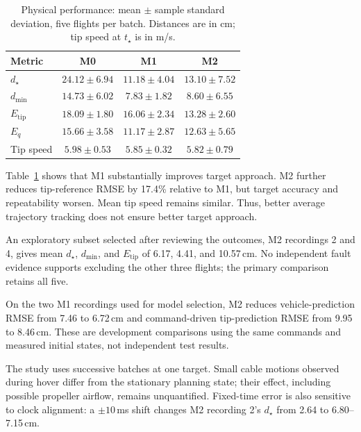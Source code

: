 \begin{table}[t]
\centering
\caption{Physical performance: mean $\pm$ sample standard
deviation, five flights per batch. Distances are in cm;
tip speed at $t_\star$ is in m/s.}
\label{tab:physical_performance}
\small
\setlength{\tabcolsep}{3pt}
\begin{tabular}{@{}lccc@{}}
\toprule
Metric & M0 & M1 & M2 \\
\midrule
$d_\star$ & $24.12\pm6.94$ & $11.18\pm4.04$ & $13.10\pm7.52$ \\
$d_{\min}$ & $14.73\pm6.02$ & $7.83\pm1.82$ & $8.60\pm6.55$ \\
$E_{\mathrm{tip}}$ & $18.09\pm1.80$ & $16.06\pm2.34$ & $13.28\pm2.60$ \\
$E_q$ & $15.66\pm3.58$ & $11.17\pm2.87$ & $12.63\pm5.65$ \\
Tip speed & $5.98\pm0.53$ & $5.85\pm0.32$ & $5.82\pm0.79$ \\
\bottomrule
\end{tabular}
\end{table}

Table~\ref{tab:physical_performance} shows that M1 substantially
improves target approach. M2 further reduces tip-reference
RMSE by 17.4\% relative to M1, but target accuracy and
repeatability worsen. Mean tip speed remains similar.
Thus, better average trajectory tracking does not ensure
better target approach.

An exploratory subset selected after reviewing the outcomes,
M2 recordings 2 and 4, gives mean $d_\star$, $d_{\min}$,
and $E_{\mathrm{tip}}$ of 6.17, 4.41, and 10.57\,cm.
No independent fault evidence supports excluding the other
three flights; the primary comparison retains all five.

On the two M1 recordings used for model selection, M2 reduces
vehicle-prediction RMSE from 7.46 to 6.72\,cm and command-driven
tip-prediction RMSE from 9.95 to 8.46\,cm. These are development
comparisons using the same commands and measured initial
states, not independent test results.

The study uses successive batches at one target. Small cable
motions observed during hover differ from the stationary
planning state; their effect, including possible propeller
airflow, remains unquantified. Fixed-time error is also
sensitive to clock alignment: a $\pm10$\,ms shift changes
M2 recording 2's $d_\star$ from 2.64 to 6.80--7.15\,cm.

